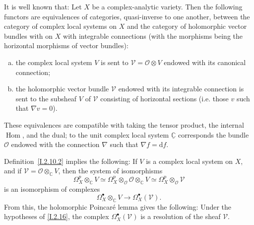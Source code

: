 \documentclass{report}
\theoremstyle{plain}
\newenvironment{proposition}[1]
    {\renewcommand\theinnercustomproposition{#1}\innercustomproposition}
    {\endinnercustomproposition}
\newenvironment{theorem}[1]
    {\renewcommand\theinnercustomtheorem{#1}\innercustomtheorem}
    {\endinnercustomlemma}
\theoremstyle{definition}
\newcommand{\sh}{\mathscr}
\newcommand{\CC}{\mathbb{C}}
\newcommand{\dd}{\mathrm{d}}
\DeclareMathOperator{\Hom}{Hom}
\newcommand{\oldpage}[1]{\marginpar{\footnotesize$\Big\vert$ \textit{p.~#1}}}
\begin{document}
It is well known that:
\begin{theorem}{2.17}
\label{I.2.17}
  Let $X$ be a complex-analytic variety.
  Then the following functors are equivalences of categories, quasi-inverse to one another, between the category of complex local systems on $X$ and the category of holomorphic vector bundles with on $X$ with integrable connections (with the morphisms being the horizontal morphisms of vector bundles):
  \begin{enumerate}[a)]
    \item the complex local system $V$ is sent to $\sh{V}=\sh{O}\otimes V$ endowed with its canonical connection;
    \item the holomorphic vector bundle $\sh{V}$ endowed with its integrable connection is sent to the subsheaf $V$ of $\sh{V}$ consisting of horizontal sections (i.e. those $v$ such that $\nabla v=0$).
  \end{enumerate}
\end{theorem}

These equivalences are compatible with taking the tensor product, the internal $\Hom$, and the dual;
to the unit complex local system $\underline{\CC}$ corresponds the bundle $\sh{O}$ endowed with the connection $\nabla$ such that $\nabla f=\dd f$.

Definition~\cref{I.2.10.2} implies the following:
\begin{proposition}{2.18}
\label{I.2.18}
  If $V$ is a complex local system on $X$, and if $\sh{V}=\sh{O}\otimes_\CC V$,
\oldpage{13}
  then the system of isomorphisms
  \[
    \Omega_X^p\otimes_\CC V
    \simeq
    \Omega_X^p\otimes_\sh{O}\sh{O}\otimes_\CC V
    \simeq
    \Omega_X^p\otimes_\sh{O}\sh{V}
  \]
  is an isomorphism of complexes
  \[
    \Omega_X^\bullet\otimes_\CC V \to \Omega_X^\bullet(\sh{V}).
  \]
\end{proposition}
From this, the holomorphic Poincar\'{e} lemma gives the following:
\begin{proposition}{2.19}
\label{I.2.19}
  Under the hypotheses of \cref{I.2.16}, the complex $\Omega_X^\bullet(\sh{V})$ is a resolution of the sheaf $\sh{V}$.
\end{proposition}
\end{document}
